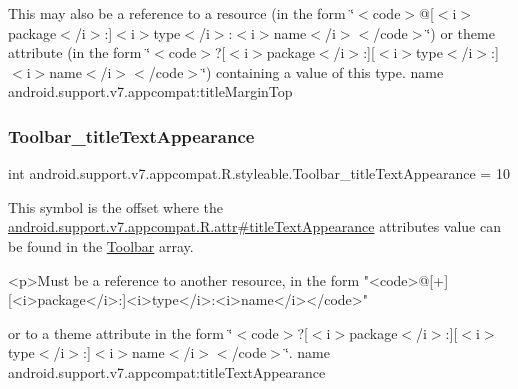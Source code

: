 This may also be a reference to a resource (in the form \char`\"{}$<$code$>$@\mbox{[}$<$i$>$package$<$/i$>$\+:\mbox{]}$<$i$>$type$<$/i$>$\+:$<$i$>$name$<$/i$>$$<$/code$>$\char`\"{}) or theme attribute (in the form \char`\"{}$<$code$>$?\mbox{[}$<$i$>$package$<$/i$>$\+:\mbox{]}\mbox{[}$<$i$>$type$<$/i$>$\+:\mbox{]}$<$i$>$name$<$/i$>$$<$/code$>$\char`\"{}) containing a value of this type.  name android.\+support.\+v7.\+appcompat\+:title\+Margin\+Top \mbox{\label{classandroid_1_1support_1_1v7_1_1appcompat_1_1R_1_1styleable_a95960040ba30a96fcd381c8f67ec461d}} 
\subsubsection{\texorpdfstring{Toolbar\+\_\+title\+Text\+Appearance}{Toolbar\_titleTextAppearance}}
{\footnotesize\ttfamily int android.\+support.\+v7.\+appcompat.\+R.\+styleable.\+Toolbar\+\_\+title\+Text\+Appearance = 10\hspace{0.3cm}{\ttfamily [static]}}

This symbol is the offset where the \hyperlink{classandroid_1_1support_1_1v7_1_1appcompat_1_1R_1_1attr_a1025276e3fbb799cf954a6774ad2ec97}{android.\+support.\+v7.\+appcompat.\+R.\+attr\#title\+Text\+Appearance} attribute\textquotesingle{}s value can be found in the \hyperlink{classandroid_1_1support_1_1v7_1_1appcompat_1_1R_1_1styleable_a2daba9587ef9f700f2d54cf13435cb32}{Toolbar} array.

\begin{DoxyVerb}      <p>Must be a reference to another resource, in the form "<code>@[+][<i>package</i>:]<i>type</i>:<i>name</i></code>"
\end{DoxyVerb}
 or to a theme attribute in the form \char`\"{}$<$code$>$?\mbox{[}$<$i$>$package$<$/i$>$\+:\mbox{]}\mbox{[}$<$i$>$type$<$/i$>$\+:\mbox{]}$<$i$>$name$<$/i$>$$<$/code$>$\char`\"{}.  name android.\+support.\+v7.\+appcompat\+:title\+Text\+Appearance \mbox{\label{classandroid_1_1support_1_1v7_1_1appcompat_1_1R_1_1styleable_a5597aef1e76e3ced24dcc4d749c2af73}} 
